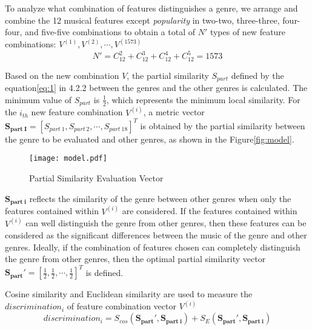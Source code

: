 \documentclass[12pt]{article}  %
\newenvironment{shrinkeq}[1]
{ \bgroup
	\addtolength\abovedisplayshortskip{#1}
	\addtolength\abovedisplayskip{#1}
	\addtolength\belowdisplayshortskip{#1}
	\addtolength\belowdisplayskip{#1}}
{\egroup\ignorespacesafterend}
\begin{document}
To analyze what combination of features distinguishes a genre, we arrange and combine the 12 musical features except \emph{popularity} in two-two, three-three, four-four, and five-five combinations to obtain a total of $N'$ types of new feature combinations: $V^{(1)},V^{(2)},\cdots,V^{(1573)}$
\begin{shrinkeq}{-1.5ex}
	\begin{equation}
		N'=C_{12}^2+C_{12}^3+C_{12}^4+C_{12}^5=1573
	\end{equation}
\end{shrinkeq}


Based on the new combination $V$, the partial similarity $S_{part}$ defined by the equation\eqref{eq:1} in 4.2.2 between the genres and the other genres is calculated. The minimum value of $S_{part}$ is $\frac{1}{2}$, which represents the minimum local similarity. For the $i_{th}$ new feature combination $V^{(i)}$, a metric vector $\mathbf{S_{part\ I}}=[S_{part\ 1},S_{part\ 2},\cdots,S_{part\ 18}]^T$ is obtained by the partial similarity between the genre to be evaluated and other genres, as shown in the Figure\eqref{fig:model}.

\begin{figure}[htbp]
	\centering
	\texttt{[image: model.pdf]}
	\caption{Partial Similarity Evaluation Vector}\label{fig:model}
\end{figure}
\vspace{-0.5cm}
$\mathbf{S_{part\ i}}$ reflects the similarity of the genre between other genres when only the features contained within $V^{(i)}$ are considered. If the features contained within $V^{(i)}$ can well distinguish the genre from other genres, then these features can be considered as the significant differences between the music of the genre and other genres. Ideally, if the combination of features chosen can completely distinguish the genre from other genres, then the optimal partial similarity vector $\mathbf{S_{part}'}=[\frac{1}{2},\frac{1}{2},\cdots,\frac{1}{2}]^T$ is defined.

Cosine similarity and Euclidean similarity are used to measure the $discrimination_i$ of feature combination vector $V^{(i)}$
\begin{shrinkeq}{-1.5ex}
	\begin{equation}
	discrimination_i=S_{cos}(\mathbf{S_{part}'},\mathbf{S_{part\ i}})+S_E(\mathbf{S_{part}'},\mathbf{S_{part\ i}})
	\end{equation}
\end{shrinkeq}
\end{document}
